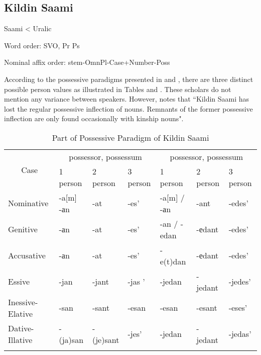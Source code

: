 \subsection{Kildin Saami}

Saami < Uralic

Word order: SVO, Pr Ps

Nominal affix order: stem-OmnPl-Case+Number-Poss

According to the possessive paradigms presented in \cite{kuruch_saamsko-russkij_1985} and \cite{kert_saamskij_1971}, there are three distinct possible person values as illustrated in Tables  and . These scholars do not mention any variance between speakers. However, \cite{riesler_kildin_2022} notes that ``Kildin Saami has lost the regular possessive inflection of nouns. Remnants of the former possessive inflection are only found occasionally with kinship nouns".

\begin{table}[ht]
\centering
\begin{tabular}{lllllll}
\toprule
\multicolumn{1}{c}{\multirow{2}{*}{Case}} & \multicolumn{3}{c}{\Sg{} possessor, \Sg{} possessum} & \multicolumn{3}{c}{\Pl{} possessor, \Sg{} possessum}\\
\multicolumn{1}{c}{} & 1 person & 2 person & 3 person & 1 person & 2 person & 3 person \\\midrule

Nominative & \parbox{1.5cm}{-a{[}m{]} \\ -аn} & -at & -es' & -a{[}m{]} / -аn & -ant & -edes' \\\addlinespace

Genitive & -аn & -at & -es' & -an / -edan & -еdant & -edes' \\\addlinespace

Accusative & -аn & -at & -es' & -e(t)dan & -еdant & -edes' \\\addlinespace

Essive & -jan & -jant & -jas ' & -jedan & -jedant & -jedes' \\\addlinespace
\parbox{2cm}{Inessive-Elative} & -san & -sant & -esan & -esan & -esant & -eses' \\\addlinespace

\parbox{2cm}{Dative-Illative} & -(ja)san & -(je)sant & -jes' & -jedan & -jedant & -jedas' \\\addlinespace

\bottomrule
\end{tabular}
\caption{Part of Possessive Paradigm of Kildin Saami}\label{saami_poss1}
\end{table}

